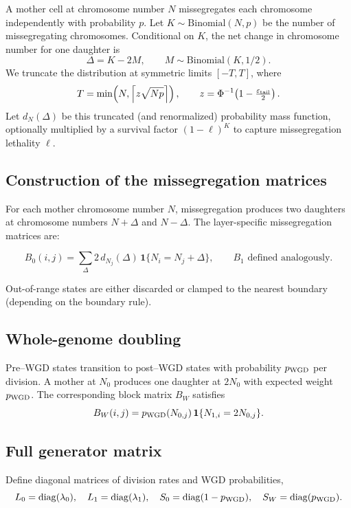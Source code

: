 \documentclass{article}
\begin{document}
A mother cell at chromosome number $N$ missegregates each chromosome
independently with probability $p$.
Let $K \sim \mathrm{Binomial}(N,p)$ be the number of missegregating chromosomes.
Conditional on $K$, the net change in chromosome number for one daughter is
\[
\Delta = K - 2M,
\qquad
M \sim \mathrm{Binomial}(K,1/2).
\]
We truncate the distribution at symmetric limits $[-T,T]$, where
\[
T = \min\!\left(N,
\left\lceil z \sqrt{Np}\right\rceil\right),
\qquad
z = \Phi^{-1}\!\left(1 - \tfrac{\varepsilon_{\rm tail}}{2}\right).
\]
Let $d_N(\Delta)$ be this truncated (and renormalized) probability mass
function, optionally multiplied by a survival factor $(1-\ell)^{K}$ to capture
missegregation lethality $\ell$.

\subsection*{Construction of the missegregation matrices}

For each mother chromosome number $N$, missegregation produces two daughters
at chromosome numbers $N+\Delta$ and $N-\Delta$.  
The layer-specific missegregation matrices are:

\[
B_0(i,j)
=
\sum_{\Delta}
2\, d_{N_j}(\Delta)\,
\mathbf{1}\{N_i = N_j + \Delta\},
\qquad
B_1 \text{ defined analogously.}
\]

Out-of-range states are either discarded or clamped to the nearest boundary
(depending on the boundary rule).

\subsection*{Whole-genome doubling}

Pre–WGD states transition to post–WGD states with probability $p_{\rm WGD}$ per
division.  
A mother at $N_0$ produces one daughter at $2N_0$ with expected weight
$p_{\rm WGD}$.
The corresponding block matrix $B_W$ satisfies
\[
B_W(i,j)
=
p_{\rm WGD}(N_{0,j})\,
\mathbf{1}\{N_{1,i} = 2N_{0,j}\}.
\]

\subsection*{Full generator matrix}

Define diagonal matrices of division rates and WGD probabilities,
\[
L_0 = \mathrm{diag}(\lambda_0),\quad
L_1 = \mathrm{diag}(\lambda_1),\quad
S_0 = \mathrm{diag}(1-p_{\rm WGD}),\quad
S_W = \mathrm{diag}(p_{\rm WGD}).
\]
\end{document}
